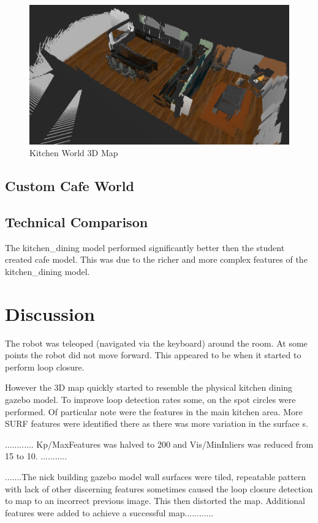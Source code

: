 \documentclass[10pt,journal,compsoc]{IEEEtran}
\begin{document}
\begin{figure}[thpb]
      \centering
      \includegraphics[width=\linewidth]{images/3dmap2}
      \caption{Kitchen World 3D Map}
      \label{fig:kitchen3d}
\end{figure}

\subsection{Custom Cafe World}

\subsection{Technical Comparison} %
The kitchen\_dining model performed significantly better then the student created cafe model. This was due to the richer and more complex features of the kitchen\_dining model.

\section{Discussion}
The robot was teleoped (navigated via the keyboard) around the room. At some points the robot did not move forward. This appeared to be when it started to perform loop closure. 

However the 3D map quickly started to resemble the physical kitchen dining gazebo model. To improve loop detection rates some, on the spot circles were performed. Of particular note were the features in the main kitchen area. More SURF features were identified there as there was more variation in the surface s.

............
Kp/MaxFeatures was halved to 200 and Vis/MinInliers was reduced from 15 to 10.
...........

.......The nick building gazebo model wall surfaces were tiled, repeatable pattern with lack of other discerning features sometimes caused the loop closure detection to map to an incorrect previous image. This then distorted the map. Additional features were added to achieve a successful map............
\end{document}
